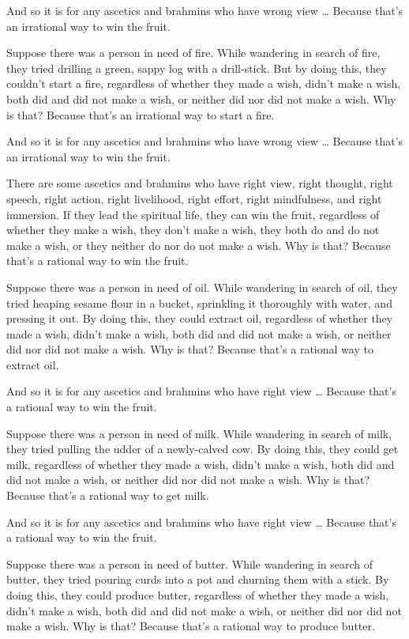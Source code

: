 \documentclass[12pt,openany]{book}%
\begin{document}
And so it is for any ascetics and brahmins who have wrong view … Because that’s an irrational way to win the fruit. 

Suppose there was a person in need of fire. While wandering in search of fire, they tried drilling a green, sappy log with a drill-stick. But by doing this, they couldn’t start a fire, regardless of whether they made a wish, didn’t make a wish, both did and did not make a wish, or neither did nor did not make a wish. Why is that? Because that’s an irrational way to start a fire. 

And so it is for any ascetics and brahmins who have wrong view … Because that’s an irrational way to win the fruit. 

There are some ascetics and brahmins who have right view, right thought, right speech, right action, right livelihood, right effort, right mindfulness, and right immersion. If they lead the spiritual life, they can win the fruit, regardless of whether they make a wish, they don’t make a wish, they both do and do not make a wish, or they neither do nor do not make a wish. Why is that? Because that’s a rational way to win the fruit. 

Suppose there was a person in need of oil. While wandering in search of oil, they tried heaping sesame flour in a bucket, sprinkling it thoroughly with water, and pressing it out. By doing this, they could extract oil, regardless of whether they made a wish, didn’t make a wish, both did and did not make a wish, or neither did nor did not make a wish. Why is that? Because that’s a rational way to extract oil. 

And so it is for any ascetics and brahmins who have right view … Because that’s a rational way to win the fruit. 

Suppose there was a person in need of milk. While wandering in search of milk, they tried pulling the udder of a newly-calved cow. By doing this, they could get milk, regardless of whether they made a wish, didn’t make a wish, both did and did not make a wish, or neither did nor did not make a wish. Why is that? Because that’s a rational way to get milk. 

And so it is for any ascetics and brahmins who have right view … Because that’s a rational way to win the fruit. 

Suppose there was a person in need of butter. While wandering in search of butter, they tried pouring curds into a pot and churning them with a stick. By doing this, they could produce butter, regardless of whether they made a wish, didn’t make a wish, both did and did not make a wish, or neither did nor did not make a wish. Why is that? Because that’s a rational way to produce butter. 
\end{document}
